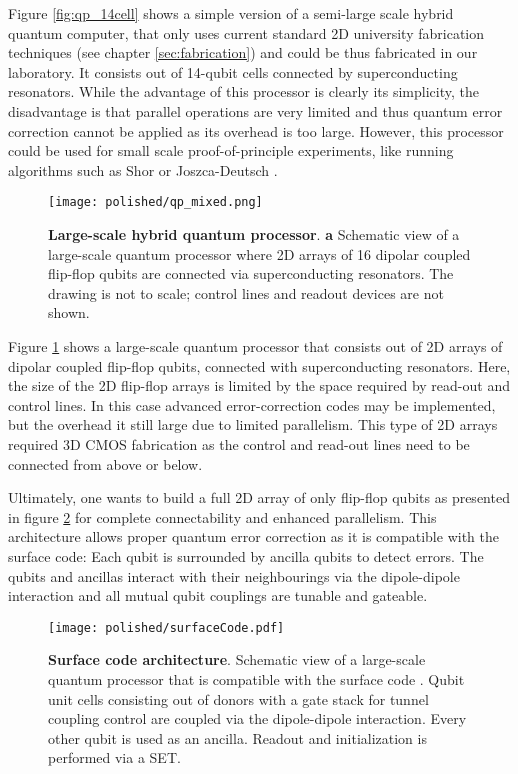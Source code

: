 Figure \ref{fig:qp_14cell} shows a simple version of a semi-large scale hybrid quantum computer, that only uses current standard 2D university fabrication techniques (see chapter \ref{sec:fabrication}) and could be thus fabricated in our laboratory. It consists out of 14-qubit cells connected by superconducting resonators. While the advantage of this processor is clearly its simplicity, the disadvantage is that parallel operations are very limited and thus quantum error correction cannot be applied as its overhead is too large. However, this processor could be used for small scale proof-of-principle experiments, like running algorithms such as Shor or Joszca-Deutsch \cite{Shor, Joszca}. 

\begin{figure}
	\centering
	\texttt{[image: polished/qp\_mixed.png]}
	\caption[Large-scale hybrid quantum processor]{\textbf{Large-scale hybrid quantum processor}.
		\textbf{a} Schematic view of a large-scale quantum processor where 2D arrays of 16 dipolar coupled flip-flop qubits are connected via superconducting resonators. The drawing is not to scale; control lines and readout devices are not shown.}
	\label{fig:qp_mixed}
\end{figure}

Figure \ref{fig:qp_mixed} shows a large-scale quantum processor that consists out of 2D arrays of dipolar coupled flip-flop qubits, connected with superconducting resonators. Here, the size of the 2D flip-flop arrays is limited by the space required by read-out and control lines. In this case advanced error-correction codes may be implemented\cite{Knill2005,Nickerson2013,Terhal2015,Li2018a}, but the overhead it still large due to limited parallelism. This type of 2D arrays required 3D CMOS fabrication as the control and read-out lines need to be connected from above or below. 

Ultimately, one wants to build a full 2D array of only flip-flop qubits as presented in figure \ref{fig:qp_surfaceCode} for complete connectability and enhanced parallelism. This architecture allows proper quantum error correction as it is compatible with the surface code\cite{Fowler2012}: Each qubit is surrounded by ancilla qubits to detect errors. The qubits and ancillas interact with their neighbourings via the dipole-dipole interaction and all mutual qubit couplings are tunable and gateable. 

\begin{figure}
	\centering
	\texttt{[image: polished/surfaceCode.pdf]}
	\caption[Surface code architecture]{\textbf{Surface code architecture}. Schematic view of a large-scale quantum processor that is compatible with the surface code \cite{Fowler2012}. Qubit unit cells consisting out of donors with a gate stack for tunnel coupling control are coupled via the dipole-dipole interaction. Every other qubit is used as an ancilla. Readout and initialization is performed via a SET. }
	\label{fig:qp_surfaceCode}
\end{figure}



